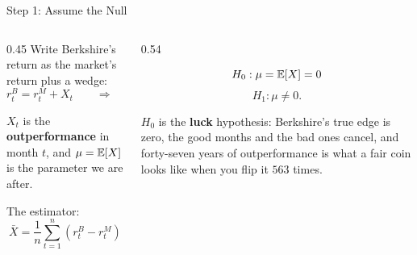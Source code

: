 \documentclass[9pt,english,aspectratio=169]{beamer}
\begin{document}
\begin{frame}{Step 1: Assume the Null}

  \begin{columns}[T]
    \begin{column}{0.45\textwidth}
      \vspace{0.3em}
      Write Berkshire's return as the market's return plus a wedge:
      \[
        r^{B}_t = r^{M}_t + X_t
        \qquad\Longrightarrow\qquad
        X_t = r^{B}_t - r^{M}_t .
      \]

      \vspace{0.2em}
      $X_t$ is the \textbf{outperformance} in month $t$, and $\mu = \mathbb{E}[X]$ is
      the parameter we are after.
      \pause

      \vspace{0.5em}
      \begin{methodbox}
        The estimator:
        \vspace{-0.3em}
        \[
          \bar{X} = \frac{1}{n}\sum_{t=1}^{n}
                     \left(r^{B}_t - r^{M}_t\right)
        \]
      \end{methodbox}
    \end{column}
    \pause
    \begin{column}{0.54\textwidth}
      \vspace{0.3em}
      \begin{methodbox}
        \[
          H_0: \mu = \mathbb{E}[X] = 0
        \]
        \vspace{-1.2em}
        \[
          H_1: \mu \neq 0 .
        \]
      \end{methodbox}
      \pause

      \vspace{0.6em}
      $H_0$ is the \textbf{luck} hypothesis: Berkshire's true edge is zero, the
      good months and the bad ones cancel, and forty-seven years of
      outperformance is what a fair coin looks like when you flip it $563$
      times.
      
    \end{column}
  \end{columns}

\end{frame}
\end{document}
